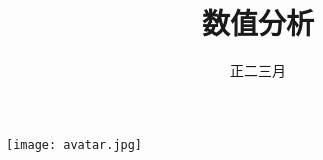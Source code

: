 \documentclass[cn,hazy,cyan,14pt,screen]{elegantnote}
\title{数值分析}
\author{正二三月}
\date{}
\begin{document}
\maketitle

\centerline{
  \texttt{[image: avatar.jpg]}
}

\clearpage



\clearpage



\end{document}
